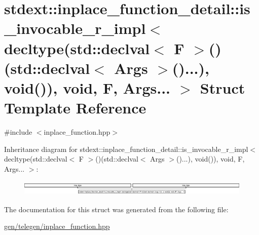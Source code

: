 \hypertarget{structstdext_1_1inplace__function__detail_1_1is__invocable__r__impl_3_01decltype_07std_1_1declva53be7366370c87c5d74810a4225ea3b9}{}\section{stdext\+:\+:inplace\+\_\+function\+\_\+detail\+:\+:is\+\_\+invocable\+\_\+r\+\_\+impl$<$ decltype(std\+:\+:declval$<$ F $>$()(std\+:\+:declval$<$ Args $>$()...), void()), void, F, Args... $>$ Struct Template Reference}
\label{structstdext_1_1inplace__function__detail_1_1is__invocable__r__impl_3_01decltype_07std_1_1declva53be7366370c87c5d74810a4225ea3b9}


{\ttfamily \#include $<$inplace\+\_\+function.\+hpp$>$}

Inheritance diagram for stdext\+:\+:inplace\+\_\+function\+\_\+detail\+:\+:is\+\_\+invocable\+\_\+r\+\_\+impl$<$ decltype(std\+:\+:declval$<$ F $>$()(std\+:\+:declval$<$ Args $>$()...), void()), void, F, Args... $>$\+:\begin{figure}[H]
\begin{center}
\leavevmode
\includegraphics[height=0.727273cm]{structstdext_1_1inplace__function__detail_1_1is__invocable__r__impl_3_01decltype_07std_1_1declva53be7366370c87c5d74810a4225ea3b9}
\end{center}
\end{figure}


The documentation for this struct was generated from the following file\+:\begin{DoxyCompactItemize}
\item 
\hyperlink{gen_2telegen_2inplace__function_8hpp}{gen/telegen/inplace\+\_\+function.\+hpp}\end{DoxyCompactItemize}
